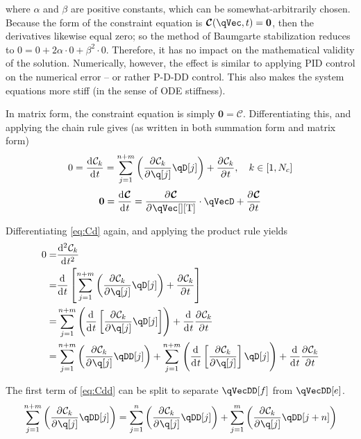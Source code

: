\documentclass[11pt]{article}
\newcommand{\oD}[2]{
    \frac{\mathrm{d}\mspace{1mu}#1}{\mathrm{d}\mspace{1mu}#2}
}
\newcommand{\oDD}[2]{
    \frac{\mathrm{d}^{2}\mspace{1mu}#1}{\mathrm{d}\mspace{1mu}#2^2}
}
\newcommand{\pD}[2]{
    \frac{\partial\mspace{1mu}#1}{\partial\mspace{1mu}#2}
}
\begin{document}
where $\alpha$ and $\beta$ are positive constants, which can be somewhat-arbitrarily chosen. Because the form of the constraint equation is $\bm{\mathcal{C}}(\qVec, t)=\mathbf{0}$, then the derivatives likewise equal zero; so the method of Baumgarte stabilization reduces to $0=0+2\alpha\cdot0+\beta^2\cdot0$. Therefore, it has no impact on the mathematical validity of the solution. Numerically, however, the effect is similar to applying PID control on the numerical error -- or rather P-D-DD control. This also makes the system equations more stiff (in the sense of ODE stiffness).

In matrix form, the constraint equation is simply $\mathbf{0}=\bm{\mathcal{C}}$. Differentiating this, and applying the chain rule gives (as written in both summation form and matrix form)
\begin{equation} \label{eq:Cd}
    0 = \oD{\mathcal{C}_k}{t}
    = \sum_{j=1}^{n+m} \del{\pD{\mathcal{C}_k}{\q[j]}\qD[j]}
        + \pD{\mathcal{C}_k}{t}
    ,\quad k\in[1,N_c]
\end{equation}
\begin{equation} \label{eq:Cd-matrix}
    \mathbf{0} = \oD{\bm{\mathcal{C}}}{t}
    = \pD{\bm{\mathcal{C}}}{\qVec[][\mathrm{T}]} \cdot \qVecD
    + \pD{\bm{\mathcal{C}}}{t}
\end{equation}

Differentiating \eqref{eq:Cd} again, and applying the product rule yields
\begin{align} \label{eq:Cdd}
    0 =& \oDD{\mathcal{C}_k}{t} \nonumber\\
    =& \oD{}{t}\sbr{\sum_{j=1}^{n+m} \del{\pD{\mathcal{C}_k}{\q[j]}\qD[j]}
        + \pD{\mathcal{C}_k}{t}} \nonumber\\
    =& \sum_{j=1}^{n+m} \del{\oD{}{t}\sbr{\pD{\mathcal{C}_k}{\q[j]}\qD[j]}}
        + \oD{}{t}\pD{\mathcal{C}_k}{t} \nonumber\\
    =& \sum_{j=1}^{n+m} \del{\pD{\mathcal{C}_k}{\q[j]}\qDD[j]}
        + \sum_{j=1}^{n+m} \del{\oD{}{t}\sbr{\pD{\mathcal{C}_k}{\q[j]}}\qD[j]}
        + \oD{}{t}\pD{\mathcal{C}_k}{t}
\end{align}

The first term of \eqref{eq:Cdd} can be split to separate $\qVecDD[f]$ from $\qVecDD[e]$.
\begin{equation}
    \sum_{j=1}^{n+m} \del{\pD{\mathcal{C}_k}{\q[j]}\qDD[j]}
    = \sum_{j=1}^{n} \del{\pD{\mathcal{C}_k}{\q[j]}\qDD[j]}
        + \sum_{j=1}^{m} \del{\pD{\mathcal{C}_k}{\q[j]}\qDD[j+n]}
\end{equation}
\end{document}
